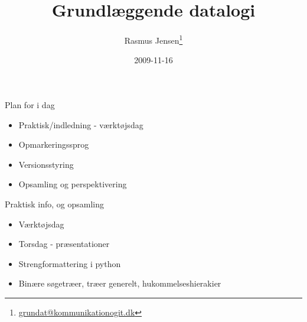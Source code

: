 \documentclass[a4paper,landscape]{slides}
\title{Grundlæggende datalogi}
\author{Rasmus Jensen\footnote{\url{grundat@kommunikationogit.dk}}}
\date{2009-11-16}
\begin{document}
\maketitle
\begin{comment}
* Praktisk info, og opsamling
** Værktøjsdag
** Torsdag - præsentationer
** Strengformattering i python
** Binære søgetræer, træer generelt, hukommelseshierakier

* Tekstuel opmarkering
** Layout vs. indhold. Opdeling efter funktionalitet
** Opmarkeringssprog: HTML, docbook, LaTeX, wiki, pandoc, ...
** Træstruktur af tekstdata
** Tekst versus binære formater
** Typografi, læsbarhed
** Introduktion til LaTeX for rapportskrivning

* Versionskontrol
** VCS - version control systems.
** Unlimited undo samt backup.
** Samarbejdsværktøj
** Tekst vs. binære data
** Cvs, svn, git, mercurial, ...
** Eksempel: svn hosted at code.google.com (http for adgang fra kua's net, diverse GUI, kræver open source)

* Perspektivering og repetition
** Python som programmeringssprog, og programmering generelt
** Web-programmering: simple CGI-scripts for forståelse, - versus CMS
** Algoritmer og model af maskinen som grundforståelse
** Designprincipper og metoder, - inkrementel udvikling, NIH, DRY, modularisering, 3-tier model, præsentation vs. indhold.
** Værktøj, - scripting, kommandoprompt, markupsprog, versionskontrol, ... 
\end{comment}

\begin{slide}
	\begin{center} {\large 
            Plan for i dag
	} \end{center}
	\begin{itemize} \addtolength{\itemsep}{-\baselineskip}
            \item Praktisk/indledning - værktøjsdag
            \item Opmarkeringssprog
            \item Versionsstyring
            \item Opsamling og perspektivering
	\end{itemize}
\end{slide}

\begin{slide}
	\begin{center} {\large 
            Praktisk info, og opsamling
	} \end{center}
	\begin{itemize} \addtolength{\itemsep}{-\baselineskip}
              \item Værktøjsdag
              \item Torsdag - præsentationer
              \item Strengformattering i python
              \item Binære søgetræer, træer generelt, hukommelseshierakier
	\end{itemize}
\end{slide}
\end{document}
